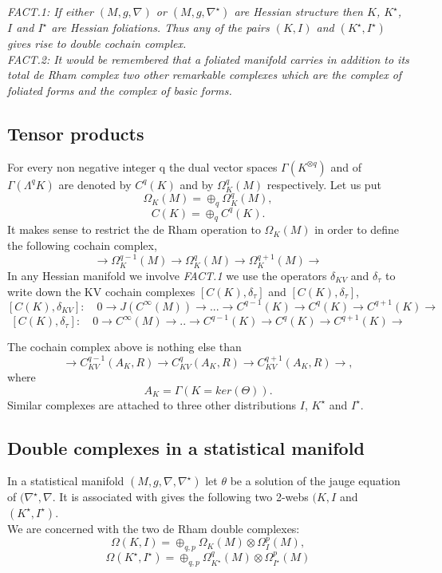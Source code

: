 \textit{FACT.1: If either $(M, g,\nabla)$ or $(M, g, \nabla^\star)$ are Hessian structure then $K$, $K^\star$, $I$ and $I^\star$ are Hessian foliations. Thus any of the pairs $(K,I)$ and $(K^\star,I^\star)$ gives rise to double cochain complex.} \\

\textit{FACT.2: It would be remembered that a foliated manifold carries in addition to its total de Rham complex two other remarkable complexes which are the complex of foliated forms and the complex of basic forms.}\\
\subsection{Tensor products}
For every non negative integer q the dual vector spaces 
$\Gamma(K^{\otimes q})$ and of $\Gamma(\Lambda^qK)$ are denoted by  $C^q(K)$ and by $\Omega^q_K(M)$ respectively. Let us put
$$\Omega_K(M) = \oplus_q \Omega^q_K(M),$$
$$C(K) = \oplus_qC^q(K).$$
It makes sense to restrict the de Rham operation to $\Omega_K(M)$ in order to define the following cochain complex,
$$\rightarrow \Omega^{q-1}_K(M) \rightarrow \Omega^q_K(M) \rightarrow \Omega^{q+1}_K(M) \rightarrow $$
In any Hessian manifold we involve \textit{FACT.1} we use the operators $\delta_{KV}$ and $\delta_\tau$ to write down the KV cochain complexes $[C(K),\delta_\tau]$ and $[C(K),\delta_\tau]$,
$$[C(K),\delta_{KV}]:\quad 0\rightarrow J(C^\infty(M)) \rightarrow ... \rightarrow C^{q-1}(K)\rightarrow C^q(K)\rightarrow C^{q+1}(K)\rightarrow $$
$$[C(K),\delta_\tau]:\quad 0\rightarrow C^\infty(M)\rightarrow..\rightarrow C^{q-1}(K)\rightarrow C^q(K)\rightarrow C^{q+1}(K)\rightarrow $$



The cochain complex above is nothing else than
$$\rightarrow C^{q-1}_{KV}(A_K,R)\rightarrow  C^q_{KV}(A_K,R)\rightarrow C^{q+1}_{KV}(A_K,R)\rightarrow, $$
where
$$A_K = \Gamma(K = ker(\Theta)).$$
Similar complexes are attached to three other distributions $I$, $K^\star$ and $I^\star$.
\subsection{Double complexes in a statistical manifold}
In a statistical manifold $(M,g,\nabla,\nabla^\star)$ let $\theta$ be a solution of the jauge equation of $(\nabla^\star,\nabla$. It is associated with gives the following two 2-webs
$(K,I$ and $(K^\star,I^\star)$.\\
We are concerned with the two de Rham double complexes:  
$$\Omega(K,I) = \oplus_{q,p}\Omega_K(M)\otimes \Omega^p_I(M),$$
$$\Omega(K^\star,I^\star) = \oplus_{q,p}\Omega^q_{K^\star}(M)\otimes\Omega^p_{I^\star}(M)$$
